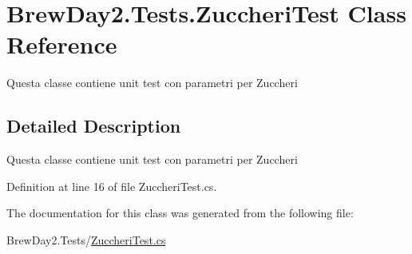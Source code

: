 \hypertarget{class_brew_day2_1_1_tests_1_1_zuccheri_test}{}\section{Brew\+Day2.\+Tests.\+Zuccheri\+Test Class Reference}
\label{class_brew_day2_1_1_tests_1_1_zuccheri_test}


Questa classe contiene unit test con parametri per Zuccheri 




\subsection{Detailed Description}
Questa classe contiene unit test con parametri per Zuccheri



Definition at line 16 of file Zuccheri\+Test.\+cs.



The documentation for this class was generated from the following file\+:\begin{DoxyCompactItemize}
\item 
Brew\+Day2.\+Tests/\mbox{\hyperlink{_zuccheri_test_8cs}{Zuccheri\+Test.\+cs}}\end{DoxyCompactItemize}
